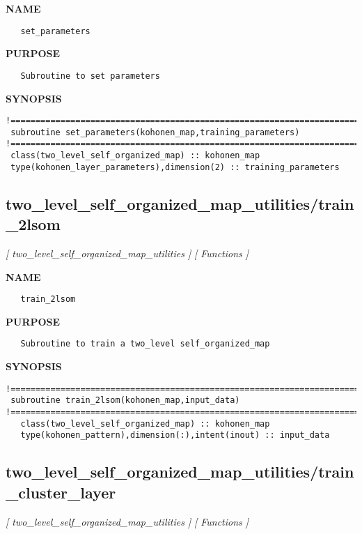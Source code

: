 \documentclass{article}
\begin{document}
\label{ch:robo76}
\label{ch:two_level_self_organized_map_utilities_set_parameters}
\textbf{NAME}
\begin{verbatim}
   set_parameters
\end{verbatim}
\textbf{PURPOSE}
\begin{verbatim}
   Subroutine to set parameters
\end{verbatim}
\textbf{SYNOPSIS}
\begin{verbatim}
!========================================================================================  
 subroutine set_parameters(kohonen_map,training_parameters)
!========================================================================================  
 class(two_level_self_organized_map) :: kohonen_map
 type(kohonen_layer_parameters),dimension(2) :: training_parameters
\end{verbatim}
\newpage
\subsection{two\_level\_self\_organized\_map\_utilities/train\_2lsom}
\textsl{[ two\_level\_self\_organized\_map\_utilities ]}
\textsl{[ Functions ]}

\label{ch:robo77}
\label{ch:two_level_self_organized_map_utilities_train_2lsom}
\textbf{NAME}
\begin{verbatim}
   train_2lsom
\end{verbatim}
\textbf{PURPOSE}
\begin{verbatim}
   Subroutine to train a two_level self_organized_map 
\end{verbatim}
\textbf{SYNOPSIS}
\begin{verbatim}
!========================================================================================
 subroutine train_2lsom(kohonen_map,input_data)
!========================================================================================
   class(two_level_self_organized_map) :: kohonen_map
   type(kohonen_pattern),dimension(:),intent(inout) :: input_data
\end{verbatim}
\newpage
\subsection{two\_level\_self\_organized\_map\_utilities/train\_cluster\_layer}
\textsl{[ two\_level\_self\_organized\_map\_utilities ]}
\textsl{[ Functions ]}
\end{document}
